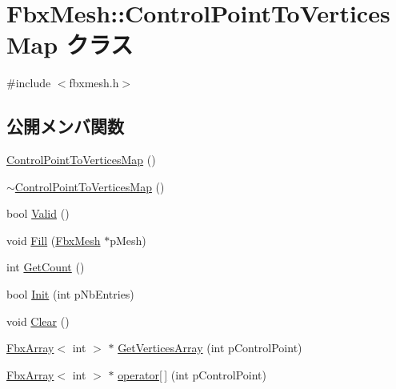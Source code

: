 \hypertarget{class_fbx_mesh_1_1_control_point_to_vertices_map}{}\section{Fbx\+Mesh\+:\+:Control\+Point\+To\+Vertices\+Map クラス}
\label{class_fbx_mesh_1_1_control_point_to_vertices_map}


{\ttfamily \#include $<$fbxmesh.\+h$>$}

\subsection*{公開メンバ関数}
\begin{DoxyCompactItemize}
\item 
\hyperlink{class_fbx_mesh_1_1_control_point_to_vertices_map_ac659f06d0a5ecec9a069edbb1ae0212b}{Control\+Point\+To\+Vertices\+Map} ()
\item 
\hyperlink{class_fbx_mesh_1_1_control_point_to_vertices_map_a967f9481ea77b0a6d2311a1de1af53d3}{$\sim$\+Control\+Point\+To\+Vertices\+Map} ()
\item 
bool \hyperlink{class_fbx_mesh_1_1_control_point_to_vertices_map_af5295f57570dd004f1e574fdc96e2257}{Valid} ()
\item 
void \hyperlink{class_fbx_mesh_1_1_control_point_to_vertices_map_a1598d46833d46c0a5fa8e94daaf9f31b}{Fill} (\hyperlink{class_fbx_mesh}{Fbx\+Mesh} $\ast$p\+Mesh)
\item 
int \hyperlink{class_fbx_mesh_1_1_control_point_to_vertices_map_aaae531e3980e3e778e23f268d9abc6fb}{Get\+Count} ()
\item 
bool \hyperlink{class_fbx_mesh_1_1_control_point_to_vertices_map_a30fd6a395444a8d74573afac1b9938b0}{Init} (int p\+Nb\+Entries)
\item 
void \hyperlink{class_fbx_mesh_1_1_control_point_to_vertices_map_a67934620ada9fcebe16c85a76454c53f}{Clear} ()
\item 
\hyperlink{class_fbx_array}{Fbx\+Array}$<$ int $>$ $\ast$ \hyperlink{class_fbx_mesh_1_1_control_point_to_vertices_map_a539c1cef6be5b1a303b8269d942f8ecb}{Get\+Vertices\+Array} (int p\+Control\+Point)
\item 
\hyperlink{class_fbx_array}{Fbx\+Array}$<$ int $>$ $\ast$ \hyperlink{class_fbx_mesh_1_1_control_point_to_vertices_map_a1f73d39ced81f85a0eb91d4b9c4d6a2c}{operator\mbox{[}$\,$\mbox{]}} (int p\+Control\+Point)
\end{DoxyCompactItemize}


